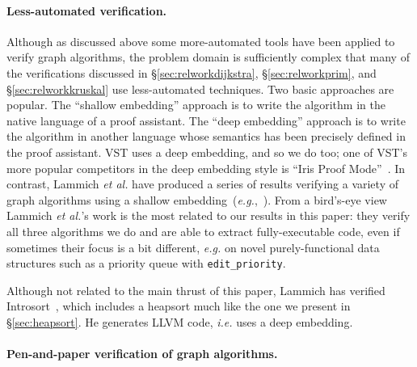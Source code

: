 \paragraph{Less-automated verification.}
Although as discussed above some more-automated tools have been applied to verify graph algorithms, the problem domain is sufficiently complex that many of the verifications discussed in \S\ref{sec:relworkdijkstra}, \S\ref{sec:relworkprim}, and \S\ref{sec:relworkkruskal} use less-automated techniques.  Two basic approaches are popular.  The ``shallow embedding'' approach is to write the algorithm in the native language of a proof assistant.  The ``deep embedding'' approach is to write the algorithm in another language whose semantics has been precisely defined in the proof assistant.  VST uses a deep embedding, and so we do too; one of VST's more popular competitors in the deep embedding style is ``Iris Proof Mode''~\cite{DBLP:conf/popl/KrebbersTB17}.  In contrast, Lammich \emph{et al.} have produced a series of results verifying a variety of graph algorithms using a shallow embedding~(\emph{e.g.},~\cite{DBLP:conf/itp/Lammich14,DBLP:journals/afp/LammichN19,DBLP:journals/afp/HaslbeckLB19,DBLP:journals/jar/LammichS19,DBLP:conf/itp/LammichS16}).  From a bird's-eye view Lammich \emph{et al.}'s work is the most related to our results in this paper: they verify all three algorithms we do and are able to extract fully-executable code, even if sometimes their focus is a bit different, \emph{e.g.} on novel purely-functional data structures such as a  priority queue with \texttt{edit\_priority}.  %

Although not related to the main thrust of this paper, Lammich has verified Introsort~\cite{DBLP:conf/cade/Lammich20}, which includes a heapsort much like the one we present in \S\ref{sec:heapsort}.  He generates LLVM code, \emph{i.e.} uses a deep embedding.


\paragraph{Pen-and-paper verification of graph algorithms.}

